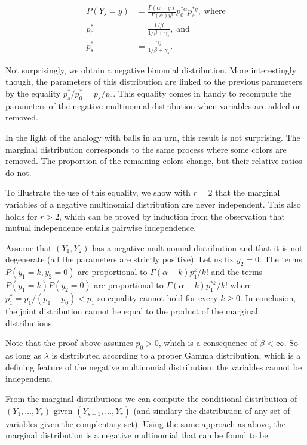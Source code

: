 \documentclass[12pt]{article}
\begin{document}
\begin{appendices}
    \begin{align*}
    P(Y_s = y) &= \frac{\Gamma(\alpha+y)}{\Gamma(\alpha)y!}
      p_0^{*\alpha} p_s^{*y}, \; \text{where} \\
    p_0^* &= \frac{1/\beta}{1/\beta + \gamma_s}, \; \text{and} \\
    p_s^* &= \frac{\gamma_i}{1/\beta + \gamma_s}.
    \end{align*}
    
    Not surprisingly, we obtain a negative binomial distribution.
    More interestingly though, the parameters of this
    distribution are linked to the previous parameters
    by the equality $p_s^* / p_0^* = p_s / p_0$. This equality
    comes in handy to recompute the parameters of the negative
    multinomial distribution when variables are added or removed.

    In the light of the analogy with balls in an urn, this result
    is not surprising. The marginal distribution corresponds to
    the same process where some colors are removed. The proportion
    of the remaining colors change, but their relative ratios do
    not.

    To illustrate the use of this equality, we show with $r=2$ that
    the marginal variables of a negative multinomial distribution
    are never independent. This also holds for $r > 2$, which can be
    proved by induction from the observation that mutual independence
    entails pairwise independence.
    
    Assume that $(Y_1,Y_2)$ has a negative multinomial distribution
    and that it is not degenerate (all the parameters are strictly
    positive).  Let us fix $y_2 = 0$. The terms
    $P(y_1 = k, y_2 = 0)$ are proportional to
    $\Gamma(\alpha+k) p_1^k/k!$ and the terms $P(y_1 = k)P(y_2 = 0)$
    are proportional to $\Gamma(\alpha+k) p_1^{*k}/k!$ where
    $p_1^* = p_1 / (p_1 + p_0) < p_1$ so equality cannot hold
    for every $k \geq 0$. In conclusion, the joint distribution
    cannot be equal to the product of the marginal distributions.

    Note that the proof above assumes $p_0 > 0$, which is
    a consequence of $\beta < \infty$. So as long as $\lambda$ is 
    distributed according to a proper Gamma distribution, which
    is a defining feature of the negative multinomial distribution, the
    variables cannot be independent.

    From the marginal distributions we can compute the conditional
    distribution of $(Y_1, \ldots, Y_s)$ given $(Y_{s+1}, \ldots, Y_r)$
    (and similary the distribution of any set of variables given
    the complentary set). Using the same approach as above, the
    marginal distribution is a negative multinomial that can be
    found to be


\end{appendices}
\end{document}
